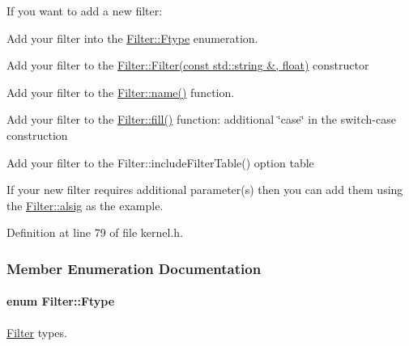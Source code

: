 If you want to add a new filter:
\begin{DoxyEnumerate}
\item Add your filter into the \hyperlink{classFilter_aa61599baec09f1011f80edc1e9118728}{Filter::Ftype} enumeration.
\item Add your filter to the \hyperlink{classFilter_a1edffffd95e96e1da86f8ec75f807264}{Filter::Filter(const std::string \&, float)} constructor
\item Add your filter to the \hyperlink{classFilter_a81c6f3de0639b637ab20d4b7b65cb1eb}{Filter::name()} function.
\item Add your filter to the \hyperlink{classFilter_a465df3da231eb2d971f6d34342ed46f1}{Filter::fill()} function: additional \char`\"{}case\char`\"{} in the switch-\/case construction
\item Add your filter to the Filter::includeFilterTable() option table
\item If your new filter requires additional parameter(s) then you can add them using the \hyperlink{classFilter_af2d531fc1caba3f3c9c923a484da3722}{Filter::alsig} as the example. 
\end{DoxyEnumerate}

Definition at line 79 of file kernel.h.



\subsubsection{Member Enumeration Documentation}
\hypertarget{classFilter_aa61599baec09f1011f80edc1e9118728}{
\paragraph[{Ftype}]{\setlength{\rightskip}{0pt plus 5cm}enum {\bf Filter::Ftype}}\hfill}
\label{classFilter_aa61599baec09f1011f80edc1e9118728}


\hyperlink{classFilter}{Filter} types. 

